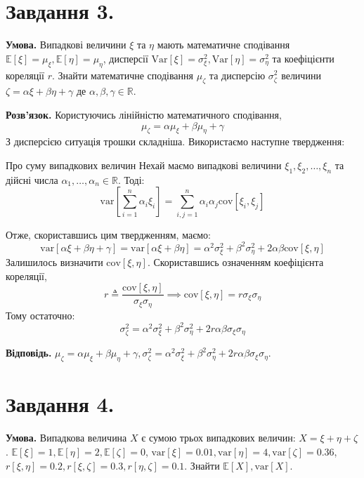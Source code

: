 \documentclass[14pt]{extarticle}
\begin{document}
\section*{Завдання 3.}

\textbf{Умова.} Випадкові величини $\xi$ та $\eta$ мають математичне сподівання $\mathbb{E}[\xi]=\mu_{\xi},\mathbb{E}[\eta]=\mu_{\eta}$, дисперсії $\text{Var}[\xi]=\sigma_{\xi}^2,\text{Var}[\eta]=\sigma_{\eta}^2$ та коефіцієнти кореляції $r$. Знайти математичне сподівання $\mu_{\zeta}$ та дисперсію $\sigma_{\zeta}^2$ величини $\zeta=\alpha\xi + \beta\eta + \gamma$ де $\alpha,\beta,\gamma \in \mathbb{R}$. 

\textbf{Розв'язок.} Користуючись лінійністю математичного сподівання,
\[
\mu_{\zeta} = \alpha \mu_{\xi} + \beta\mu_{\eta} + \gamma
\]
З дисперсією ситуація трошки складніша. Використаємо наступне твердження:

\begin{statement*}{Про суму випадкових величин}
  Нехай маємо випадкові величини $\xi_1,\xi_2,\dots,\xi_n$ та дійсні числа $\alpha_1,\dots,\alpha_n \in \mathbb{R}$. Тоді:
    \[
    \text{var}\left[\sum_{i=1}^n \alpha_i\xi_i\right] = \sum_{i,j=1}^n \alpha_i\alpha_j \text{cov}[\xi_i,\xi_j]
    \]
\end{statement*}

Отже, скориставшись цим твердженням, маємо:
\[
\text{var}[\alpha \xi + \beta \eta + \gamma] = \text{var}[\alpha\xi + \beta\eta] = \alpha^2\sigma_{\xi}^2 + \beta^2\sigma_{\eta}^2 + 2\alpha\beta \text{cov}[\xi,\eta]
\]
Залишилось визначити $\text{cov}[\xi,\eta]$. Скориставшись означенням коефіцієнта кореляції,
\[
r \triangleq \frac{\text{cov}[\xi,\eta]}{\sigma_{\xi}\sigma_{\eta}} \implies \text{cov}[\xi,\eta]=r\sigma_{\xi}\sigma_{\eta}
\]
Тому остаточно:
\[
\sigma_{\zeta}^2 = \alpha^2\sigma_{\xi}^2 + \beta^2\sigma_{\eta}^2 + 2r\alpha\beta \sigma_{\xi}\sigma_{\eta}
\]

\textbf{Відповідь.} $\mu_{\zeta}=\alpha\mu_{\xi}+\beta\mu_{\eta}+\gamma,\sigma_{\zeta}^2 = \alpha^2\sigma_{\xi}^2 + \beta^2\sigma_{\eta}^2 + 2r\alpha\beta \sigma_{\xi}\sigma_{\eta}$.

\section*{Завдання 4.}

\textbf{Умова.} Випадкова величина $X$ є сумою трьох випадкових величин: $X = \xi+\eta+\zeta$. $\mathbb{E}[\xi]=1,\mathbb{E}[\eta]=2,\mathbb{E}[\zeta]=0$, $\text{var}[\xi]=0.01,\text{var}[\eta]=4,\text{var}[\zeta]=0.36$, $r[\xi,\eta]=0.2,r[\xi,\zeta]=0.3,r[\eta,\zeta]=0.1$. Знайти $\mathbb{E}[X],\text{var}[X]$.
\end{document}
